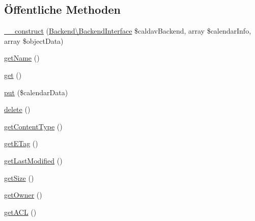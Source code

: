 \subsection*{Öffentliche Methoden}
\begin{DoxyCompactItemize}
\item 
\mbox{\hyperlink{class_sabre_1_1_cal_d_a_v_1_1_calendar_object_a32c0aade32b1c0e4585965ef9f8378df}{\+\_\+\+\_\+construct}} (\mbox{\hyperlink{interface_sabre_1_1_cal_d_a_v_1_1_backend_1_1_backend_interface}{Backend\textbackslash{}\+Backend\+Interface}} \$caldav\+Backend, array \$calendar\+Info, array \$object\+Data)
\item 
\mbox{\hyperlink{class_sabre_1_1_cal_d_a_v_1_1_calendar_object_a99fc7894745ccc28aff30a587f39536b}{get\+Name}} ()
\item 
\mbox{\hyperlink{class_sabre_1_1_cal_d_a_v_1_1_calendar_object_adef5802dc47306abb1e00a18a63ca7eb}{get}} ()
\item 
\mbox{\hyperlink{class_sabre_1_1_cal_d_a_v_1_1_calendar_object_a54849fa5cf3916e8f108485f5ffb0851}{put}} (\$calendar\+Data)
\item 
\mbox{\hyperlink{class_sabre_1_1_cal_d_a_v_1_1_calendar_object_ad212aa77b88852aa58f90ed253609f4d}{delete}} ()
\item 
\mbox{\hyperlink{class_sabre_1_1_cal_d_a_v_1_1_calendar_object_a73609b33bcf07b1460038bb125b9d013}{get\+Content\+Type}} ()
\item 
\mbox{\hyperlink{class_sabre_1_1_cal_d_a_v_1_1_calendar_object_a8cbcfda4ad2f5d8ef67a7fb11ca4ea07}{get\+E\+Tag}} ()
\item 
\mbox{\hyperlink{class_sabre_1_1_cal_d_a_v_1_1_calendar_object_af38c4e426495f55a2222b5413f7b388b}{get\+Last\+Modified}} ()
\item 
\mbox{\hyperlink{class_sabre_1_1_cal_d_a_v_1_1_calendar_object_a18e48832b3f486a1c5c95da1c2d39661}{get\+Size}} ()
\item 
\mbox{\hyperlink{class_sabre_1_1_cal_d_a_v_1_1_calendar_object_a13769288f14402408b0bd4328d48349c}{get\+Owner}} ()
\item 
\mbox{\hyperlink{class_sabre_1_1_cal_d_a_v_1_1_calendar_object_a74f6cef6011e3c8045d1d57b0115ce60}{get\+A\+CL}} ()
\end{DoxyCompactItemize}
